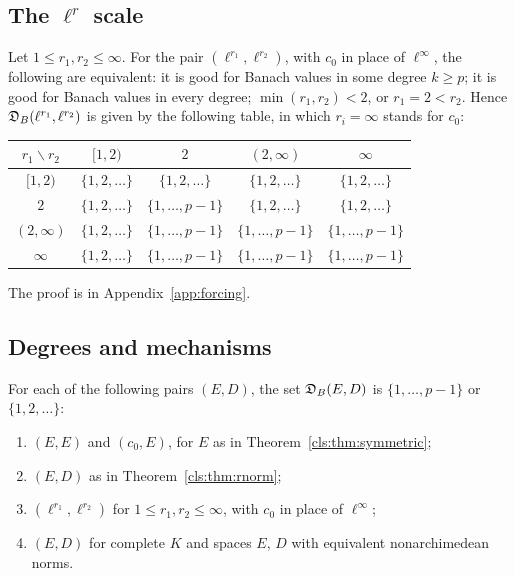 \subsection{The \texorpdfstring{$\ell^r$}{l\textasciicircum r} scale}

\begin{corollary}\label{cls:cor:lr-table}
Let $1\le r_1,r_2\le\infty$. For the pair $(\ell^{r_1},\ell^{r_2})$, with $c_0$ in place of $\ell^\infty$, the following
are equivalent: it is good for Banach values in some degree $k\ge p$; it is good for Banach values in every degree;
$\min(r_1,r_2)<2$, or $r_1=2<r_2$. Hence $\mathfrak D_B(\ell^{r_1},\ell^{r_2})$ is given by the following table, in which $r_i=\infty$ stands
for $c_0$:
\begin{center}
\small
\begin{tabular}{c|cccc}
$r_1\backslash r_2$ & $[1,2)$ & $2$ & $(2,\infty)$ & $\infty$\\ \hline
$[1,2)$ & $\{1,2,\dots\}$ & $\{1,2,\dots\}$ & $\{1,2,\dots\}$ & $\{1,2,\dots\}$\\
$2$ & $\{1,2,\dots\}$ & $\{1,\dots,p-1\}$ & $\{1,2,\dots\}$ & $\{1,2,\dots\}$\\
$(2,\infty)$ & $\{1,2,\dots\}$ & $\{1,\dots,p-1\}$ & $\{1,\dots,p-1\}$ & $\{1,\dots,p-1\}$\\
$\infty$ & $\{1,2,\dots\}$ & $\{1,\dots,p-1\}$ & $\{1,\dots,p-1\}$ & $\{1,\dots,p-1\}$
\end{tabular}
\end{center}
\end{corollary}

The proof is in Appendix~\ref{app:forcing}.

\subsection{Degrees and mechanisms}

\begin{corollary}\label{cls:cor:dichotomy}
For each of the following pairs $(E,D)$, the set $\mathfrak D_B(E,D)$ is $\{1,\dots,p-1\}$ or $\{1,2,\dots\}$:
\begin{enumerate}
\item $(E,E)$ and $(c_0,E)$, for $E$ as in Theorem~\ref{cls:thm:symmetric};
\item $(E,D)$ as in Theorem~\ref{cls:thm:rnorm};
\item $(\ell^{r_1},\ell^{r_2})$ for $1\le r_1,r_2\le\infty$, with $c_0$ in place of $\ell^\infty$;
\item $(E,D)$ for complete $K$ and spaces $E$, $D$ with equivalent nonarchimedean norms.
\end{enumerate}
\end{corollary}

